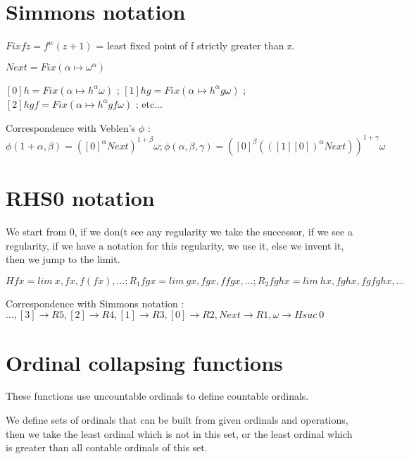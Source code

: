 \documentclass[10pt]{article}
\begin{document}
\section{Simmons notation}
\vspace{-0.4cm}
\( Fix f z = f^w(z+1)\) = least fixed point of f strictly greater than z.

\( Next = Fix (\alpha \mapsto \omega^\alpha) \) 

\( [0] h = Fix (\alpha \mapsto h^\alpha \omega) \) ;
\( [1] h g = Fix (\alpha \mapsto h^\alpha g \omega) \) ;
\( [2] h g f = Fix (\alpha \mapsto h^\alpha g f \omega) \) ; etc...

Correspondence with Veblen's \(\phi\) : \( \phi(1+\alpha,\beta) = ([0]^\alpha Next)^{1+\beta} \omega ; 
 \phi(\alpha,\beta,\gamma) = ([0]^\beta (([1] [0])^\alpha Next))^{1+\gamma} \omega \)


\vspace{-0.6cm}

\section{RHS0 notation}
\vspace{-0.4cm}
We start from 0, if we don(t see any regularity we take the successor, if we see a regularity, if we have a notation for this regularity, we use it, else we invent it, then we jump to the limit.

\( H f x = lim\ x, f x, f (f x), \ldots ; R_1 f g x = lim\ g x, f g x, f f g x, \ldots ; R_2 f g h x = lim\ h x, f g h x, f g f g h x, \ldots \)

Correspondence with Simmons notation : 
\( \ldots, [3] \rightarrow R5, [2] \rightarrow R4, [1] \rightarrow R3, [0] \rightarrow R2, Next \rightarrow R1, \omega \rightarrow H suc\ 0 \)

\vspace{-0.6cm}

\section{Ordinal collapsing functions}
\vspace{-0.4cm}
These functions use uncountable ordinals to define countable ordinals.

We define sets of ordinals that can be built from given ordinals and operations, then we take the least ordinal which is not in this set, or the least ordinal which is greater than all contable ordinals of this set.
\end{document}
